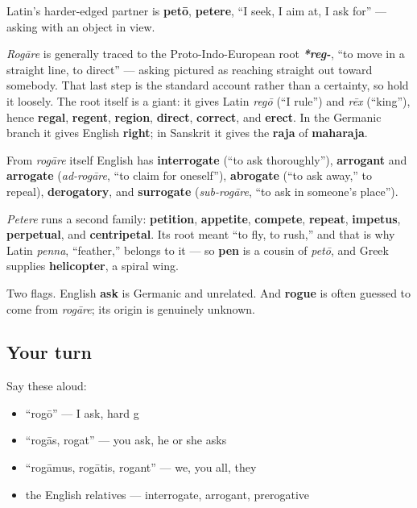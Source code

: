 Latin's harder-edged partner is \textbf{petō}, \textbf{petere}, \textquotedblleft{}I seek, I aim at, I ask for\textquotedblright{} — asking with an object in view.

\begin{cousinweb}
\emph{Rogāre} is generally traced to the Proto-Indo-European root \emph{\textbf{*reg-}}, \textquotedblleft{}to move in a straight line, to direct\textquotedblright{} — asking pictured as reaching straight out toward somebody. That last step is the standard account rather than a certainty, so hold it loosely. The root itself is a giant: it gives Latin \emph{regō} (\textquotedblleft{}I rule\textquotedblright{}) and \emph{rēx} (\textquotedblleft{}king\textquotedblright{}), hence \textbf{regal}, \textbf{regent}, \textbf{region}, \textbf{direct}, \textbf{correct}, and \textbf{erect}. In the Germanic branch it gives English \textbf{right}; in Sanskrit it gives the \textbf{raja} of \textbf{maharaja}.

From \emph{rogāre} itself English has \textbf{interrogate} (\textquotedblleft{}to ask thoroughly\textquotedblright{}), \textbf{arrogant} and \textbf{arrogate} (\emph{ad-rogāre}, \textquotedblleft{}to claim for oneself\textquotedblright{}), \textbf{abrogate} (\textquotedblleft{}to ask away,\textquotedblright{} to repeal), \textbf{derogatory}, and \textbf{surrogate} (\emph{sub-rogāre}, \textquotedblleft{}to ask in someone's place\textquotedblright{}).

\emph{Petere} runs a second family: \textbf{petition}, \textbf{appetite}, \textbf{compete}, \textbf{repeat}, \textbf{impetus}, \textbf{perpetual}, and \textbf{centripetal}. Its root meant \textquotedblleft{}to fly, to rush,\textquotedblright{} and that is why Latin \emph{penna}, \textquotedblleft{}feather,\textquotedblright{} belongs to it — so \textbf{pen} is a cousin of \emph{petō}, and Greek supplies \textbf{helicopter}, a spiral wing.

Two flags. English \textbf{ask} is Germanic and unrelated. And \textbf{rogue} is often guessed to come from \emph{rogāre}; its origin is genuinely unknown.
\end{cousinweb}

\subsection*{Your turn}
Say these aloud:

\begin{itemize}
\raggedright
  \item \textquotedblleft{}rogō\textquotedblright{} — I ask, hard g
  \item \textquotedblleft{}rogās, rogat\textquotedblright{} — you ask, he or she asks
  \item \textquotedblleft{}rogāmus, rogātis, rogant\textquotedblright{} — we, you all, they
  \item the English relatives — interrogate, arrogant, prerogative
\end{itemize}

